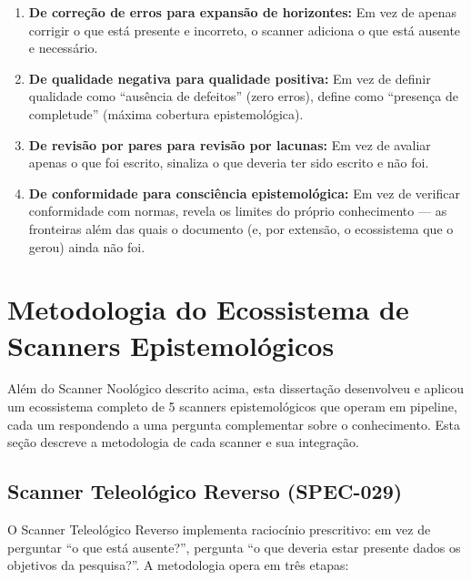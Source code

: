 \begin{enumerate}
  \item \textbf{De correção de erros para expansão de horizontes:} Em vez de apenas corrigir o que está presente e incorreto, o scanner adiciona o que está ausente e necessário.
  \item \textbf{De qualidade negativa para qualidade positiva:} Em vez de definir qualidade como ``ausência de defeitos'' (zero erros), define como ``presença de completude'' (máxima cobertura epistemológica).
  \item \textbf{De revisão por pares para revisão por lacunas:} Em vez de avaliar apenas o que foi escrito, sinaliza o que deveria ter sido escrito e não foi.
  \item \textbf{De conformidade para consciência epistemológica:} Em vez de verificar conformidade com normas, revela os limites do próprio conhecimento --- as fronteiras além das quais o documento (e, por extensão, o ecossistema que o gerou) ainda não foi.
\end{enumerate}

\section{Metodologia do Ecossistema de Scanners Epistemológicos}

Além do Scanner Noológico descrito acima, esta dissertação desenvolveu e aplicou um ecossistema completo de 5 scanners epistemológicos que operam em pipeline, cada um respondendo a uma pergunta complementar sobre o conhecimento. Esta seção descreve a metodologia de cada scanner e sua integração.

\subsection{Scanner Teleológico Reverso (SPEC-029)}

O Scanner Teleológico Reverso implementa raciocínio prescritivo: em vez de perguntar ``o que está ausente?'', pergunta ``o que deveria estar presente dados os objetivos da pesquisa?''. A metodologia opera em três etapas:

